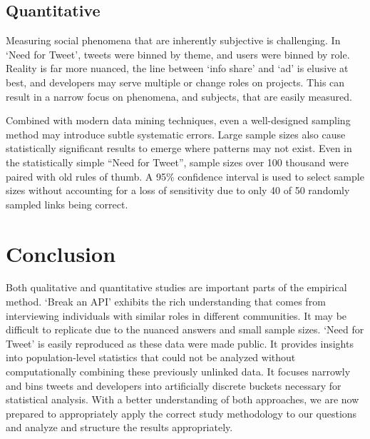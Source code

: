 \documentclass[conference]{IEEEtran}
\begin{document}
\subsection{Quantitative}

Measuring social phenomena that are inherently subjective is challenging. In `Need for Tweet', tweets were binned by theme, and users were binned by role. Reality is far more nuanced, the line between `info share' and `ad' is elusive at best, and developers may serve multiple or change roles on projects. This can result in a narrow focus on phenomena, and subjects, that are easily measured.

Combined with modern data mining techniques, even a well-designed sampling method may introduce subtle systematic errors. Large sample sizes also cause statistically significant results to emerge where patterns may not exist. Even in the statistically simple ``Need for Tweet'', sample sizes over 100 thousand were paired with old rules of thumb. A 95\% confidence interval is used to select sample sizes without accounting for a loss of sensitivity due to only 40 of 50 randomly sampled links being correct. %

\section{Conclusion}

Both qualitative and quantitative studies are important parts of the empirical method. `Break an API' exhibits the rich understanding that comes from interviewing individuals with similar roles in different communities. It may be difficult to replicate due to the nuanced answers and small sample sizes. `Need for Tweet' is easily reproduced as these data were made public. It provides insights into population-level statistics that could not be analyzed without computationally combining these previously unlinked data. It focuses narrowly and bins tweets and developers into artificially discrete buckets necessary for statistical analysis. With a better understanding of both approaches, we are now prepared to appropriately apply the correct study methodology to our questions and analyze and structure the results appropriately.



\end{document}
